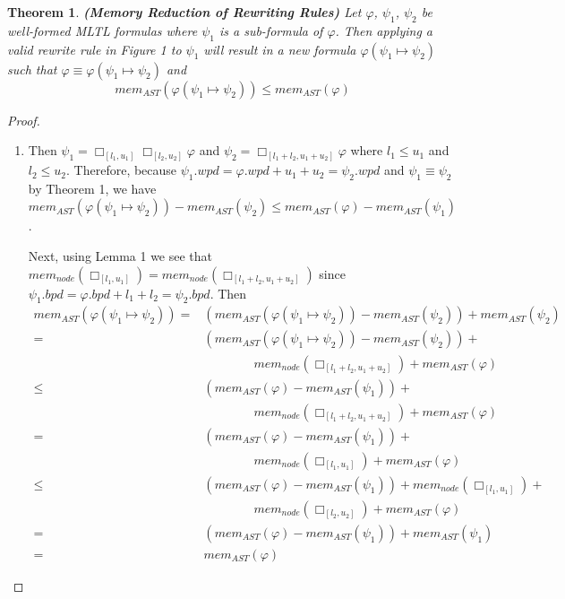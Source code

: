 \documentclass{article}
\newtheorem{theorem}{Theorem}
\begin{document}
\begin{theorem}{\emph{\bf(Memory Reduction of Rewriting Rules)}}
    Let $\varphi$, $\psi_1$, $\psi_2$ be well-formed MLTL formulas where $\psi_1$ is a sub-formula of $\varphi$.
Then applying a valid rewrite rule in Figure 1 to $\psi_1$ will result in a new formula $\varphi(\psi_1 \mapsto \psi_2)$ such that $\varphi \equiv \varphi(\psi_1 \mapsto \psi_2)$ and 
$$mem_{AST}(\varphi(\psi_1 \mapsto \psi_2)) \leq mem_{AST}(\varphi)$$
\end{theorem}

\begin{proof}

\begin{enumerate}

    \item[(R1):] Then $\psi_1 =  \Box_{[l_1,u_1]}{\Box_{[l_2,u_2]}{\varphi}}$ and $\psi_2 = \Box_{[l_1+l_2,u_1+u_2]}{\varphi}$ where $l_1 \leq u_1$ and $l_2 \leq u_2$. 
Therefore, because $\psi_1.wpd = \varphi.wpd + u_1 + u_2 = \psi_2.wpd$ and $\psi_1 \equiv \psi_2$ by Theorem 1, we have $mem_{AST}(\varphi(\psi_1 \mapsto \psi_2)) - mem_{AST}(\psi_2)  \leq mem_{AST}(\varphi) - mem_{AST}(\psi_1)$. 

Next, using Lemma 1 we see that $mem_{node}(\Box_{[l_1,u_1]}{}) = mem_{node}(\Box_{[l_1+l_2,u_1+u_2]}{})$ since $\psi_1.bpd = \varphi.bpd + l_1 + l_2 = \psi_2.bpd$. Then
\begin{align*}
mem_{AST}(\varphi(\psi_1 \mapsto \psi_2)) = & (mem_{AST}(\varphi(\psi_1 \mapsto \psi_2)) - mem_{AST}(\psi_2)) + mem_{AST}(\psi_2) \\
= & (mem_{AST}(\varphi(\psi_1 \mapsto \psi_2)) - mem_{AST}(\psi_2)) + \\
& \qquad \qquad mem_{node}(\Box_{[l_1+l_2,u_1+u_2]}{}) + mem_{AST}(\varphi) \\
\leq & (mem_{AST}(\varphi) - mem_{AST}(\psi_1)) + \\
& \qquad \qquad mem_{node}(\Box_{[l_1+l_2,u_1+u_2]}{}) + mem_{AST}(\varphi) \\
= & (mem_{AST}(\varphi) - mem_{AST}(\psi_1)) + \\
& \qquad \qquad  mem_{node}(\Box_{[l_1,u_1]}{}) + mem_{AST}(\varphi) \\
\leq & (mem_{AST}(\varphi) - mem_{AST}(\psi_1)) + mem_{node}(\Box_{[l_1,u_1]}{}) + \\
& \qquad \qquad mem_{node}(\Box_{[l_2,u_2]}{}) + mem_{AST}(\varphi) \\
= & (mem_{AST}(\varphi) - mem_{AST}(\psi_1)) + mem_{AST}(\psi_1) \\
= & mem_{AST}(\varphi)
\end{align*}


\end{enumerate}
\end{proof}
\end{document}
